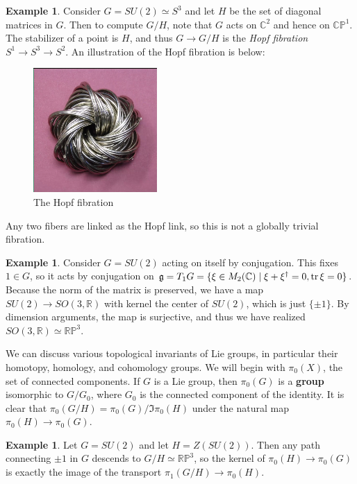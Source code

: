 \documentclass[leqno, openany]{memoir}
\theoremstyle{definition}
\newtheorem{exm}[thm]{Example}
\theoremstyle{remark}
\theoremstyle{plain}
\theoremstyle{definition}
\theoremstyle{remark}
\newcommand{\R}{\mathbb{R}}
\newcommand{\C}{\mathbb{C}}
\renewcommand{\P}{\mathbb{P}}
\newcommand{\mf}[1]{\mathfrak{#1}}
\begin{document}
\begin{exm} Consider $G = SU(2) \simeq S^3$ and let $H$ be the set of diagonal
    matrices in $G$. Then to compute $G/H$, note that $G$ acts on $\C^2$ and
    hence on $\C\P^1$. The stabilizer of a point is $H$, and thus $G \to G/H$
    is the \textit{Hopf fibration} $S^1 \to S^3 \to S^2$. An illustration of
    the Hopf fibration is below: \begin{figure}[H] \centering
        \includegraphics[scale=1]{hopf} \caption{The Hopf fibration}%
    \label{fig:hopf} \end{figure} Any two fibers are linked as the Hopf link,
    so this is not a globally trivial fibration.  \end{exm}

\begin{exm} Consider $G = SU(2)$ acting on itself by conjugation. This fixes $1
    \in G$, so it acts by conjugation on $\mf{g} = T_1 G = \{ \xi \in M_2(\C)
    \mid \xi + \xi^{\dag} = 0, \trace \xi = 0 \}$. Because the norm of the
    matrix is preserved, we have a map $SU(2) \to SO(3, \R)$ with kernel the
    center of $SU(2)$, which is just $\{ \pm 1 \}$. By dimension arguments, the
    map is surjective, and thus we have realized $SO(3, \R) \simeq \R \P^3$.
\end{exm}

We can discuss various topological invariants of Lie groups, in particular
their homotopy, homology, and cohomology groups. We will begin with $\pi_0(X)$,
the set of connected components. If $G$ is a Lie group, then $\pi_0(G)$ is a
\textbf{group} isomorphic to $G / G_0$, where $G_0$ is the connected component
of the identity. It is clear that $\pi_0(G/H) = \pi_0(G) / \Im \pi_0(H)$ under
the natural map $\pi_0(H) \to \pi_0(G)$.

\begin{exm} Let $G = SU(2)$ and let $H = Z(SU(2))$. Then any path connecting
$\pm 1$ in $G$ descends to $G/H \simeq \R\P^3$, so the kernel of $\pi_0(H) \to
\pi_0(G)$ is exactly the image of the transport $\pi_1(G/H) \to \pi_0(H)$.
\end{exm}
\end{document}

